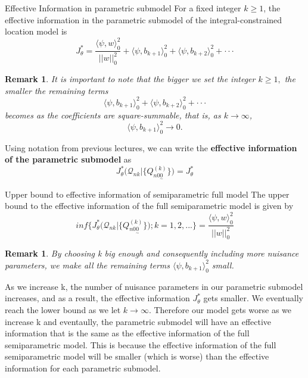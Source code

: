 \documentclass[twoside]{article}
\newtheorem{remark}[theorem]{Remark}
\newcommand{\utilde}{\underset{\sim}}
\begin{document}
\begin{proposition_exam}{Effective Information in parametric submodel}{} For a fixed integer $k \geq 1$, the effective information in the parametric submodel of the integral-constrained location model is 
\begin{equation}
J_{\theta}^{*} = \frac{\langle \psi, w \rangle_{0}^{2}}{||w||_{0}^{2}} + \langle \psi, b_{k + 1} \rangle_{0}^{2} + \langle \psi, b_{k + 2} \rangle_{0}^{2} + \cdot \cdot \cdot
\end{equation}
\end{proposition_exam}

\begin{remark} It is important to note that the bigger we set the integer $k \geq 1,$ the smaller the remaining terms $$\langle \psi, b_{k + 1} \rangle_{0}^{2} + \langle \psi, b_{k + 2} \rangle_{0}^{2} + \cdot \cdot \cdot$$ becomes as the coefficients are square-summable, that is, as $k \rightarrow \infty$, $$\langle \psi, b_{k + 1} \rangle_{0}^{2} \rightarrow 0.$$
\end{remark}

Using notation from previous lectures, we can write the \textbf{effective information of the parametric submodel} as 
$$
J_{\theta}^{*}\big(\mathcal{Q}_{nk}|\{Q_{n 0 \utilde{0}}^{(k)}\} \big) = J_{\theta}^{*}
$$

\begin{proposition_exam}{Upper bound to effective information of semiparametric full model}{} The upper bound to the effective information of the full semiparametric model is given by 
\begin{equation}
inf \bigg\{J_{\theta}^{*}\big(\mathcal{Q}_{nk}|\{Q_{n 0 \utilde{0}}^{(k)}\} \big); k = 1,2,... \bigg\} = \frac{\langle \psi, w \rangle_{0}^{2}}{||w||_{0}^{2}}
\end{equation}
\end{proposition_exam}

\begin{remark}
By choosing k big enough and consequently including more nuisance parameters, we make all the remaining terms $\langle \psi, b_{k + 1} \rangle_{0}^{2}$ small.
\end{remark}

As we increase k, the number of nuisance parameters in our parametric submodel increases, and as a result, the effective information $J_{\theta}^{*}$ gets smaller. We eventually reach the lower bound as we let $k \rightarrow \infty.$ Therefore our model gets worse as we increase k and eventaully, the parametric submodel will have an effective information that is the same as the effective information of the full semiparametric model. This is because the effective information of the full semiparametric model will be smaller (which is worse)
 than the effective information for each parametric submodel.
\end{document}
